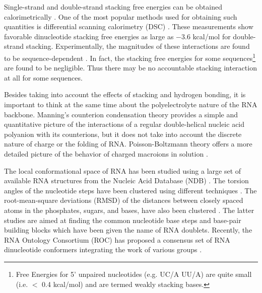 Single-strand and double-strand stacking free energies can be obtained
calorimetrically \cite{freier1985}.   One of the  most popular methods
used   for  obtaining   such  quantities   is   differential  scanning
calorimetry (DSC) \cite{marky1982}.  These measurements show favorable
dinucleotide stacking  free energies as  large as $-3.6$  kcal/mol for
double-strand  stacking.   Experimentally,  the  magnitudes  of  these
interactions      are     found      to      be     sequence-dependent
\cite{bloomfield2000}. In  fact, the  stacking free energies  for some
sequences\footnote{Free   Energies   for   5'   unpaired   nucleotides
  (e.g. UC/A  UU/A) are quite small  (i.e.  $<$ 0.4  kcal/mol) and are
  termed  weakly stacking bases.\cite{burkard1999,  burkard1999b}} are
found to  be negligible.   Thus there may  be no  accountable stacking
interaction at all for some sequences.

Besides  taking into  account  the effects  of  stacking and  hydrogen
bonding,  it  is  important  to  think  at the  same  time  about  the
polyelectrolyte  nature  of the  RNA  backbone.  Manning's  counterion
condensation theory \cite{manning1977,  manning2003} provides a simple
and   quantitative  picture   of   the  interactions   of  a   regular
double-helical  nucleic acid  polyanion with  its counterions,  but it
does   not  take   into  account   the  discrete   nature   of  charge
\cite{bloomfield2000} or the  folding of RNA. Poisson-Boltzmann theory
offers a more detailed picture of the behavior of charged macroions in
solution \cite{antypov2005, xu2007}.

The local conformational  space of RNA has been  studied using a large
set of available  RNA structures from the Nucleic  Acid Database (NDB)
\cite{berman1992}.  The  torsion angles  of the nucleotide  steps have
been   clustered    using   different   techniques   \cite{murray2003,
  schneider2004}.   The  root-mean-square  deviations  (RMSD)  of  the
distances between closely spaced  atoms in the phosphates, sugars, and
bases, have  also been clustered \cite{sykes2005}.  The latter studies
are aimed  at finding the  common nucleotide base steps  and base-pair
building  blocks which  have  been  given the  name  of RNA  doublets.
Recently, the  RNA Ontology Consortium (ROC) has  proposed a consensus
set  of RNA dinucleotide  conformers integrating  the work  of various
groups \cite{richardson2008}.


